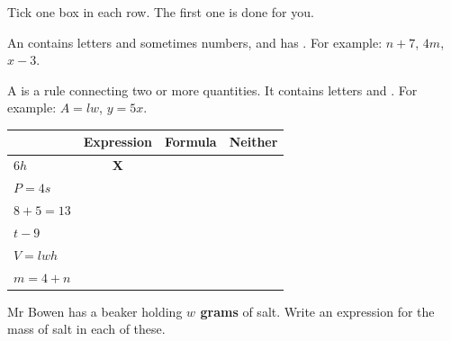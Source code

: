 \documentclass[12pt,a4paper]{article}
\begin{document}

\noindent Tick one box in each row. The first one is done for you.

\begin{remember}
  An  contains letters and sometimes numbers, and has
  . \quad For example: $n+7$, \; $4m$, \; $x-3$.

  \smallskip
  A  is a rule connecting two or more quantities. It contains
  letters and . \quad For example: $A = lw$, \; $y = 5x$.
\end{remember}

\vspace{6pt}
\noindent
\begin{tabularx}{\textwidth}{|X|c|c|c|}
  \hline
  & \textbf{Expression} & \textbf{Formula} & \textbf{Neither} \\
  \hline
  $6h$ \rule[-0.65em]{0pt}{2.0em}            & \textbf{X} & & \\ \hline
  $P = 4s$ \rule[-0.65em]{0pt}{2.0em}        & & & \\ \hline
  $8 + 5 = 13$ \rule[-0.65em]{0pt}{2.0em}    & & & \\ \hline
  $t - 9$ \rule[-0.65em]{0pt}{2.0em}         & & & \\ \hline
  $V = lwh$ \rule[-0.65em]{0pt}{2.0em}       & & & \\ \hline
  $m = 4 + n$ \rule[-0.65em]{0pt}{2.0em}     & & & \\ \hline
\end{tabularx}


\noindent Mr Bowen has a beaker holding \textbf{$w$ grams} of salt. Write an
expression for the mass of salt in each of these.
\end{document}
